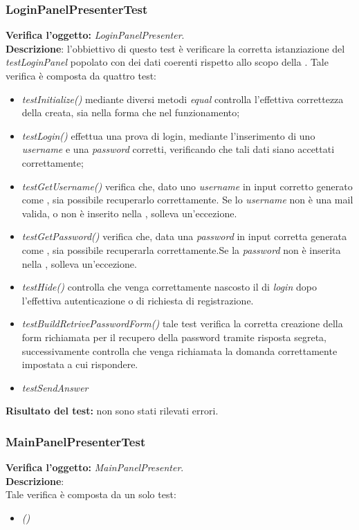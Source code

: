 \subsubsection{LoginPanelPresenterTest}
\textbf{Verifica l'oggetto:} \textit{LoginPanelPresenter}.\\
\textbf{Descrizione}: l'obbiettivo di questo test è verificare la corretta istanziazione del \textit{testLoginPanel} popolato con dei dati coerenti rispetto allo scopo della \underline{}.
Tale verifica è composta da quattro test:
\begin{itemize} 
\item \textit{testInitialize() } mediante diversi metodi \textit{equal} controlla l'effettiva correttezza della  creata, sia nella forma che nel funzionamento;
\item \textit{testLogin() } effettua una prova di login, mediante l'inserimento di uno \textit{username} e una \textit{password} corretti, verificando che tali dati siano accettati correttamente;
\item \textit{testGetUsername() } verifica che, dato uno \textit{username} in input corretto generato come \underline{}, sia possibile recuperarlo correttamente. Se lo \textit{username} non è una mail valida, o non è inserito nella , solleva un'eccezione.
\item \textit{testGetPassword() } verifica che, data una \textit{password} in input corretta generata come , sia possibile recuperarla correttamente.Se la \textit{password} non è inserita nella , solleva un'eccezione.
\item \textit{testHide()} controlla che venga correttamente nascosto il  di \textit{login} dopo l'effettiva autenticazione o di richiesta di registrazione.
\item \textit{testBuildRetrivePasswordForm()} tale test verifica la corretta creazione della form richiamata per il recupero della password tramite risposta segreta, successivamente controlla che venga richiamata la domanda correttamente impostata a cui rispondere.
\item \textit{testSendAnswer} %
\end{itemize}
\textbf{Risultato del test:} non sono stati rilevati errori.

\subsubsection{MainPanelPresenterTest}
\textbf{Verifica l'oggetto:} \textit{MainPanelPresenter}.\\
\textbf{Descrizione}:\\
Tale verifica è composta da un solo test:
\begin{itemize}
\item \textit{() } %
\end{itemize}

